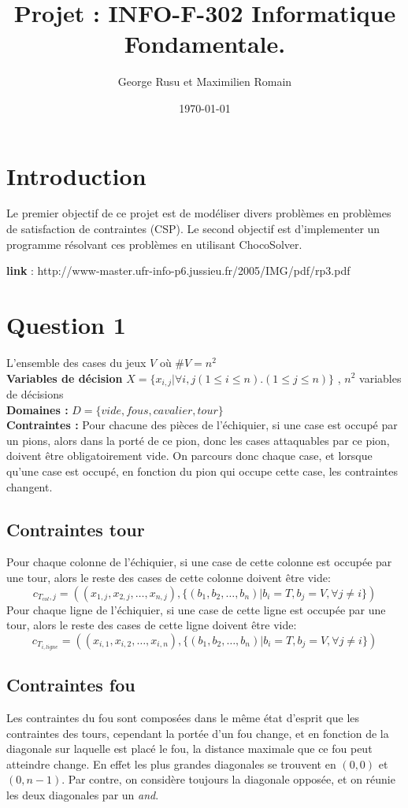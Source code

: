 \documentclass[a4paper,10pt]{article}
\title{Projet : INFO-F-302 Informatique Fondamentale.}
\author{George Rusu et Maximilien Romain}
\date{\today}
\begin{document}
\maketitle
\tableofcontents
\newpage
\section{Introduction}
Le premier objectif de ce projet est de modéliser divers problèmes en problèmes de satisfaction de contraintes (CSP). Le second objectif est d’implementer un programme résolvant ces problèmes en utilisant ChocoSolver.

\textbf{link} :  http://www-master.ufr-info-p6.jussieu.fr/2005/IMG/pdf/rp3.pdf

\section{Question 1}
L'ensemble des cases du jeux $V$ où $ \#V = n^2$ \\
\textbf {Variables de décision} $ X = \{x_{i,j} | \forall i,j (1 \leq i \leq n).(1 \leq j \leq n)\}$ , $n^2$ variables de décisions \\
\textbf{Domaines : } $ D = \{vide, fous, cavalier, tour\} $\\
\textbf{Contraintes : } Pour chacune des pièces de l'échiquier, si une case est occupé par un pions, alors dans la porté de ce pion, donc les cases attaquables par ce pion, doivent être obligatoirement vide.  On parcours donc chaque case, et lorsque qu'une case est occupé, en fonction du pion qui occupe cette case, les contraintes changent.


\subsection{Contraintes tour}
	Pour chaque colonne de l'échiquier, si une case de cette colonne est occupée par une tour, alors le reste des cases de cette colonne doivent être vide:
$$ c_{T_{col},j} = ((x_{1,j}, x_{2,j},\ldots, x_{n,j}), \{(b_1, b_2,\ldots, b_n) | b_i = T, b_j = V, \forall j \ne i\})$$
	Pour chaque ligne de l'échiquier, si une case de cette ligne est occupée par une tour, alors le reste des cases de cette ligne doivent être vide:
$$ c_{T_{i,ligne}} = ((x_{i,1}, x_{i,2},\ldots, x_{i,n}), \{(b_1, b_2,\ldots, b_n) | b_i = T, b_j = V, \forall j \ne i\})$$

\subsection{Contraintes fou}
	Les contraintes du fou sont composées dans le même état d'esprit que les contraintes des tours, cependant la portée d'un fou change, et en fonction de la diagonale sur laquelle est placé le fou, la distance maximale que ce fou peut atteindre change.  En effet les plus grandes diagonales se trouvent en $(0,0)$ et $(0,n-1)$.
	Par contre, on considère toujours la diagonale opposée, et on réunie les deux diagonales par un \emph{and}.
\end{document}
